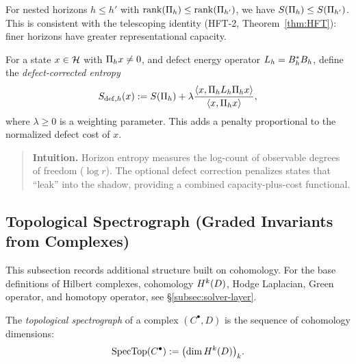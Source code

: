 \begin{remark}
For nested horizons $h \le h'$ with $\rank(\CCPi{h}) \le \rank(\CCPi{h'})$, we have $S(\CCPi{h}) \le S(\CCPi{h'})$.
This is consistent with the telescoping identity (HFT-2, Theorem~\ref{thm:HFT}): finer horizons have greater representational capacity.
\end{remark}

\begin{definition}
\label{def:defect-entropy}
For a state $x \in \cH$ with $\CCPi{h} x \ne 0$, and defect energy operator $\CCDefOp{d}{h} = \CCLeak{d}{h}^\ast \CCLeak{d}{h}$, define the \emph{defect-corrected entropy}
\[
S_{\mathrm{def},h}(x) := S(\CCPi{h}) + \lambda \frac{\langle x, \CCPi{h} \CCDefOp{d}{h} \CCPi{h} x \rangle}{\langle x, \CCPi{h} x \rangle},
\]
where $\lambda \ge 0$ is a weighting parameter.
This adds a penalty proportional to the normalized defect cost of $x$.
\end{definition}

\begin{quote}\small
\textbf{Intuition.}
Horizon entropy measures the log-count of observable degrees of freedom ($\log r$).
The optional defect correction penalizes states that ``leak'' into the shadow, providing a combined capacity-plus-cost functional.
\end{quote}

\subsection{Topological Spectrograph (Graded Invariants from Complexes)}
\label{subsec:topological-spectrograph}

This subsection records additional structure built on cohomology.
For the base definitions of Hilbert complexes, cohomology $\CCCoh{k}(D)$, Hodge Laplacian, Green operator, and homotopy operator, see \S\ref{subsec:solver-layer}.

\begin{definition}
\label{def:spectrograph}
The \emph{topological spectrograph} of a complex $(C^\bullet, D)$ is the sequence of cohomology dimensions:
\[
\mathrm{SpecTop}(C^\bullet) := \bigl( \dim \CCCoh{k}(D) \bigr)_{k}.
\]
\end{definition}

